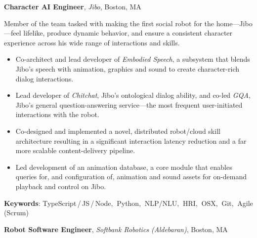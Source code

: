 \documentclass[10pt, letter]{article}
\newcommand{\years}[1]{\marginnote{\footnotesize #1}}
\newenvironment{desc*}{
  \begin{description}
    \setlength{\itemsep}{0.2pt}
    \setlength{\parskip}{-1pt}
    \setlength{\parsep}{0pt}
  }{
  \end{description}
}
\begin{document}
\years{2016 -- 2018} 
\textbf{\fontsize{10.5pt}{1em}\selectfont Character AI Engineer},
\textit{Jibo}, Boston, MA\bigskip

\vspace{-.3cm}
Member of the team tasked with making the first social robot for the home---Jibo---feel lifelike, produce dynamic behavior, and ensure a consistent character experience across his wide range of interactions and skills.
\begin{itemize}[leftmargin=*, parsep=-1pt]
\item Co-architect and lead developer of \textit{Embodied Speech}, a subsystem that blends Jibo's speech with animation, graphics and sound to create character-rich dialog interactions.
\item Lead developer of \textit{Chitchat}, Jibo's ontological dialog ability, and co-led \textit{GQA}, Jibo's general question-answering service---the most frequent user-initiated interactions with the robot.
\item Co-designed and implemented a novel, distributed robot/cloud skill architecture resulting in a significant interaction latency reduction and a far more scalable content-delivery pipeline.
\item Led development of an animation database, a core module that enables queries for, and configuration of, animation and sound assets for on-demand playback and control on Jibo.
\end{itemize}
\vspace{-.2cm}
\begin{desc*}
\item[\rm \color{redblue} \textbf{Keywords}:] TypeScript\,/\,JS\,/\,Node,$\:$ Python,$\:$ NLP/NLU,$\:$ HRI,$\:$ OSX,$\:$ Git,$\:$ Agile (Scrum)\bigbreak
\end{desc*}

\years{2014 - 2016} 
\textbf{\fontsize{10.5pt}{1em}\selectfont Robot Software Engineer},
\textit{Softbank Robotics (Aldebaran)}, Boston, MA\bigskip
\end{document}
